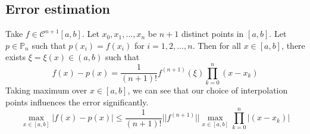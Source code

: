 \documentclass[11pt]{article}
\theoremstyle{definition}
\newcommand{\C}{\mathcal{C}}
\begin{document}
\subsection{Error estimation}
Take $f\in\C^{n+1}[a,b]$. Let $x_0,x_1,\dots,x_n$ be $n+1$ distinct points in $[a,b]$. Let $p\in\mathbb{P}_n$ such that $p(x_i)=f(x_i)$ for $i=1,2,\dots,n$. Then for all $x\in[a,b]$, there exists $\xi=\xi(x)\in (a,b)$ such that
$$f(x)-p(x)=\frac{1}{(n+1)!}f^{(n+1)}(\xi)\prod_{k=0}^n (x-x_k)$$
Taking maximum over $x\in[a,b]$, we can see that our choice of interpolation points influences the error significantly.
$$\max_{x\in[a,b]}|f(x)-p(x)|\leqslant\frac{1}{(n+1)!}||f^{(n+1)}||\max_{x\in[a,b]}\prod_{k=0}^n|(x-x_k)|$$
\end{document}
